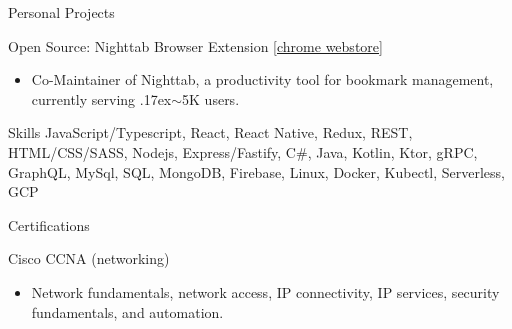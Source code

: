 \documentclass{article}
\newlength{\tabin}
\newlength{\secsep}
\newcommand{\lineunder}{\vspace*{-8pt} \\ \hspace*{-6pt} \hrulefill \\ \vspace*{-15pt}}
\newenvironment{tabbedsection}[1]{
  \begin{list}{}{
      \setlength{\itemsep}{0pt}
      \setlength{\labelsep}{0pt}
      \setlength{\labelwidth}{0pt}
      \setlength{\leftmargin}{\tabin}
      \setlength{\rightmargin}{\tabin}
      \setlength{\listparindent}{0pt}
      \setlength{\parsep}{0pt}
      \setlength{\parskip}{0pt}
      \setlength{\partopsep}{0pt}
      \setlength{\topsep}{#1}
    }
  \item[]
}{\end{list}}
\newenvironment{resume_section}[1]{
  \filbreak
  \vspace{2\secsep}
  \textsc{\large#1}
  \lineunder
  \begin{tabbedsection}{\secsep}
}{\end{tabbedsection}}
\newenvironment{resume_subsection}[2][]{
  \textbf{#2} \hfill {\footnotesize #1} \hspace{2em}
  \begin{tabbedsection}{0.5\secsep}
}{\end{tabbedsection}}
\newenvironment{subitems}{
  \renewcommand{\labelitemi}{-}
  \begin{itemize}
      \setlength{\labelsep}{1em}
}{\end{itemize}}
\begin{document}
  \begin{resume_section}{Personal Projects}
      \begin{resume_subsection}{Open Source: Nighttab Browser Extension [{\href{https://chrome.google.com/webstore/detail/nighttab/hdpcadigjkbcpnlcpbcohpafiaefanki}{chrome webstore}]}}
      \begin{subitems}
      \item Co-Maintainer of Nighttab, a productivity tool for bookmark management, currently serving {\raise.17ex\hbox{$\scriptstyle\sim$}}5K users.
      \end{subitems}
    \end{resume_subsection}
  \end{resume_section}

  \begin{resume_section}{Skills}
    JavaScript/Typescript,
    React,
    React
    Native,
    Redux,
    REST,
    HTML/CSS/SASS,
    Nodejs,
    Express/Fastify,
    C\#,
    Java,
    Kotlin,
    Ktor,
    gRPC,
    GraphQL,
    MySql,
    SQL,
    MongoDB,
    Firebase,
    Linux,
    Docker,
    Kubectl,
    Serverless,
    GCP
  \end{resume_section}

  \begin{resume_section}{Certifications}
    \begin{resume_subsection}[]{Cisco CCNA (networking)}
      \begin{subitems}
        \item Network fundamentals, network access, IP connectivity, IP services, security fundamentals, and automation.
      \end{subitems}
    \end{resume_subsection}
  \end{resume_section}
\end{document}
